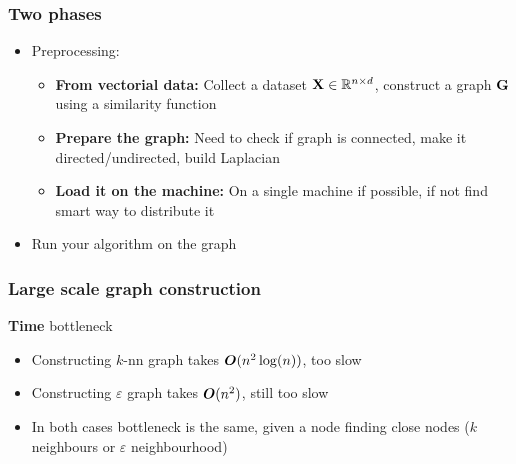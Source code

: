 \documentclass{beamer}
\begin{document}
\begin{frame}
\frametitle{Two phases}
\begin{itemize}[<+-| alert@+>]\addtolength{\itemsep}{0.75\baselineskip}
\item[1]  Preprocessing:
\begin{itemize}
\item[] \textbf{From vectorial data:} Collect a dataset $\mathbf{X} \in \mathbb{R}^{n \times d}$,
  construct a graph $\mathbf{G}$ using a similarity function
\item[] \textbf{Prepare the graph:} Need to check if graph is connected, make it directed/undirected, build Laplacian
\item[] \textbf{Load it on the machine:} On a single machine if possible, if not find smart way to distribute it
\end{itemize}
\item[2] Run your algorithm on the graph
\end{itemize}
\end{frame}

\begin{frame}
\frametitle{Large scale graph construction}

\textbf{Time} bottleneck
\begin{itemize}[<+-| alert@+>]\addtolength{\itemsep}{0.25\baselineskip}
\item Constructing $k$-nn graph takes $\boldsymbol{O}(n^2\log(n))$, too slow
\item Constructing $\varepsilon$ graph takes $\boldsymbol{O}(n^2)$, still too slow
\item In both cases bottleneck is the same, given a node finding close nodes ($k$ neighbours or $\varepsilon$ neighbourhood)
\end{itemize}
\pause
\vspace{\baselineskip}

\pause
\vspace{\baselineskip}
\end{frame}
\end{document}
